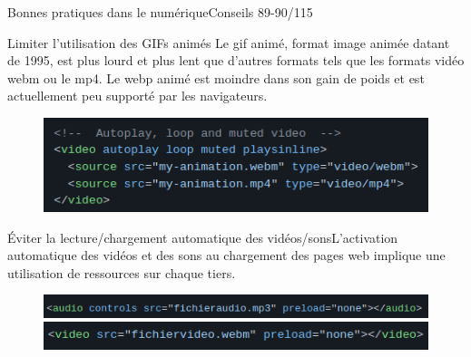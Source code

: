 

\begin{frame}{Bonnes pratiques dans le numérique}{Conseils 89-90/115}
\begin{block}{Limiter l'utilisation des GIFs animés}
Le gif animé, format image animée datant de 1995, est plus lourd et plus lent que d'autres formats tels que les formats vidéo webm ou le mp4. Le webp animé est moindre dans son gain de poids et est actuellement peu supporté par les navigateurs.
\begin{figure}
    \centering
    \includegraphics[scale=0.4]{chapitre2/wdd8/fig/c1.png}
\end{figure}
\end{block}

\begin{block}{Éviter la lecture/chargement automatique des vidéos/sons}L'activation automatique des vidéos et des sons au chargement des pages web implique une utilisation de ressources sur chaque tiers.

\begin{figure}
    \centering
    \includegraphics[scale=0.4]{chapitre2/wdd8/fig/c2.png}
    \includegraphics[scale=0.4]{chapitre2/wdd8/fig/c3.png}
\end{figure}
\end{block}
\end{frame}


